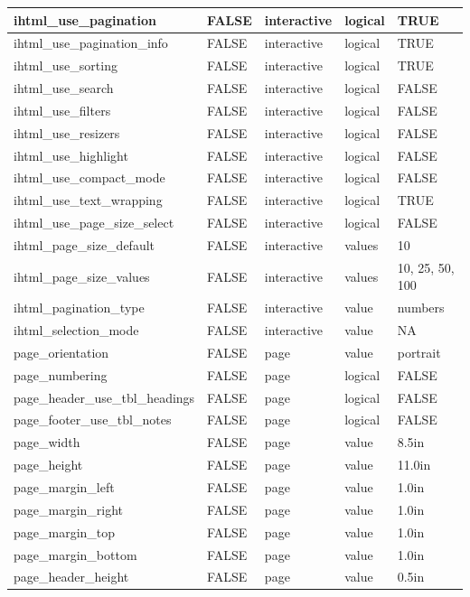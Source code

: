 \documentclass[
  letterpaper,
  DIV=11,
  numbers=noendperiod]{scrartcl}
\begin{document}
\begin{table}
{\begin{tabular}[t]{l|l|l|l|l}
\hline
ihtml\_use\_pagination & FALSE & interactive & logical & TRUE\\
\hline
ihtml\_use\_pagination\_info & FALSE & interactive & logical & TRUE\\
\hline
ihtml\_use\_sorting & FALSE & interactive & logical & TRUE\\
\hline
ihtml\_use\_search & FALSE & interactive & logical & FALSE\\
\hline
ihtml\_use\_filters & FALSE & interactive & logical & FALSE\\
\hline
ihtml\_use\_resizers & FALSE & interactive & logical & FALSE\\
\hline
ihtml\_use\_highlight & FALSE & interactive & logical & FALSE\\
\hline
ihtml\_use\_compact\_mode & FALSE & interactive & logical & FALSE\\
\hline
ihtml\_use\_text\_wrapping & FALSE & interactive & logical & TRUE\\
\hline
ihtml\_use\_page\_size\_select & FALSE & interactive & logical & FALSE\\
\hline
ihtml\_page\_size\_default & FALSE & interactive & values & 10\\
\hline
ihtml\_page\_size\_values & FALSE & interactive & values & 10, 25, 50, 100\\
\hline
ihtml\_pagination\_type & FALSE & interactive & value & numbers\\
\hline
ihtml\_selection\_mode & FALSE & interactive & value & NA\\
\hline
page\_orientation & FALSE & page & value & portrait\\
\hline
page\_numbering & FALSE & page & logical & FALSE\\
\hline
page\_header\_use\_tbl\_headings & FALSE & page & logical & FALSE\\
\hline
page\_footer\_use\_tbl\_notes & FALSE & page & logical & FALSE\\
\hline
page\_width & FALSE & page & value & 8.5in\\
\hline
page\_height & FALSE & page & value & 11.0in\\
\hline
page\_margin\_left & FALSE & page & value & 1.0in\\
\hline
page\_margin\_right & FALSE & page & value & 1.0in\\
\hline
page\_margin\_top & FALSE & page & value & 1.0in\\
\hline
page\_margin\_bottom & FALSE & page & value & 1.0in\\
\hline
page\_header\_height & FALSE & page & value & 0.5in\\

\end{tabular}}
\end{table}
\end{document}
